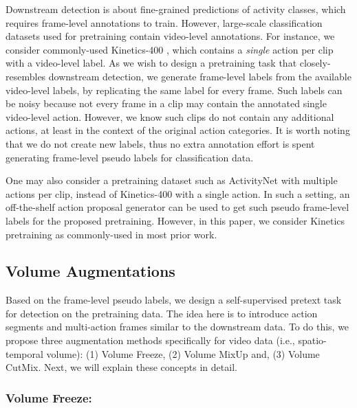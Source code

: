 \documentclass[letterpaper]{article} \usepackage{aaai23}  \usepackage{times}  \usepackage{helvet}  \usepackage{courier}  \usepackage[hyphens]{url}  \usepackage{graphicx} \urlstyle{rm} \def\UrlFont{\rm}  \usepackage{natbib}  \usepackage{caption} \frenchspacing  \setlength{\pdfpagewidth}{8.5in}  \setlength{\pdfpageheight}{11in}  \usepackage{algorithm}
\newcommand{\ch}{}
\begin{document}
Downstream detection is about fine-grained predictions of activity classes, which requires frame-level annotations to train. However, large-scale classification datasets used for pretraining contain video-level annotations. For instance, we consider commonly-used Kinetics-400 \cite{carreira2017quo}, which contains a \textit{single} action per clip with a video-level label. As we wish to design a pretraining task that closely-resembles downstream detection, we generate frame-level labels from the available video-level labels, by replicating the same label for every frame. Such labels can be noisy because not every frame in a clip may contain the annotated single video-level action. However, we know such clips do not contain any additional actions, at least in the context of the original action categories. It is worth noting that we do not create new labels, thus no extra annotation effort is spent generating frame-level pseudo labels for classification data. 

\ch{One may also consider a pretraining dataset such as ActivityNet \cite{caba2015activitynet} with multiple actions per clip, instead of Kinetics-400 \cite{carreira2017quo} with a single action. In such a setting, an off-the-shelf action proposal generator can be used to get such pseudo frame-level labels for the proposed pretraining. However, in this paper, we consider Kinetics pretraining as commonly-used in most prior work.}

\subsection{Volume Augmentations}

Based on the frame-level pseudo labels, we design a self-supervised pretext task for detection on the pretraining data. The idea here is to introduce action segments and multi-action frames similar to the downstream data. To do this, we propose three augmentation methods specifically for video data (i.e., spatio-temporal volume): (1) Volume Freeze, (2) Volume MixUp and, (3) Volume CutMix. Next, we will explain these concepts in detail.

\subsubsection{Volume Freeze:}
\end{document}
